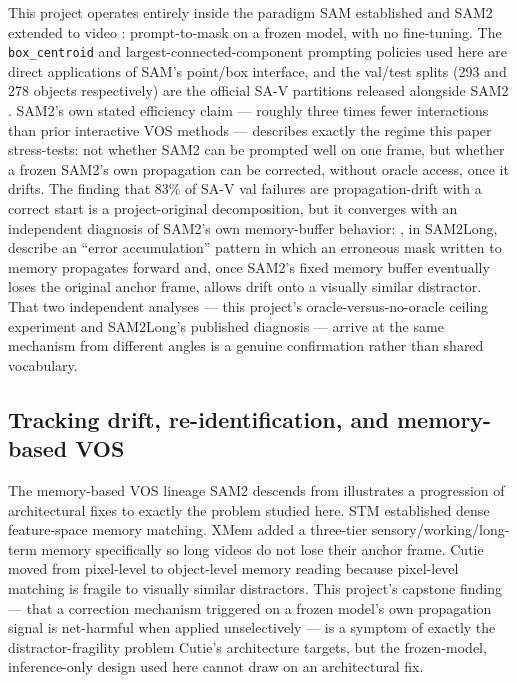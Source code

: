 \documentclass[11pt]{article}
\begin{document}
This project operates entirely inside the paradigm SAM established \citep{kirillov2023} and SAM2 extended to video \citep{ravi2024}: prompt-to-mask on a frozen model, with no fine-tuning. The \texttt{box\_centroid} and largest-connected-component prompting policies used here are direct applications of SAM's point/box interface, and the val/test splits (293 and 278 objects respectively) are the official SA-V partitions released alongside SAM2 \citep{metaai2024}. SAM2's own stated efficiency claim — roughly three times fewer interactions than prior interactive VOS methods — describes exactly the regime this paper stress-tests: not whether SAM2 can be prompted well on one frame, but whether a frozen SAM2's own propagation can be corrected, without oracle access, once it drifts. The finding that 83\% of SA-V val failures are propagation-drift with a correct start is a project-original decomposition, but it converges with an independent diagnosis of SAM2's own memory-buffer behavior: \citet{ding2024}, in SAM2Long, describe an ``error accumulation'' pattern in which an erroneous mask written to memory propagates forward and, once SAM2's fixed memory buffer eventually loses the original anchor frame, allows drift onto a visually similar distractor. That two independent analyses — this project's oracle-versus-no-oracle ceiling experiment and SAM2Long's published diagnosis — arrive at the same mechanism from different angles is a genuine confirmation rather than shared vocabulary.

\subsection{Tracking drift, re-identification, and memory-based VOS}

The memory-based VOS lineage SAM2 descends from illustrates a progression of architectural fixes to exactly the problem studied here. STM \citep{oh2019} established dense feature-space memory matching. XMem \citep{cheng2022xmem} added a three-tier sensory/working/long-term memory specifically so long videos do not lose their anchor frame. Cutie \citep{cheng2023cutie} moved from pixel-level to object-level memory reading because pixel-level matching is fragile to visually similar distractors. This project's capstone finding — that a correction mechanism triggered on a frozen model's own propagation signal is net-harmful when applied unselectively — is a symptom of exactly the distractor-fragility problem Cutie's architecture targets, but the frozen-model, inference-only design used here cannot draw on an architectural fix.
\end{document}

